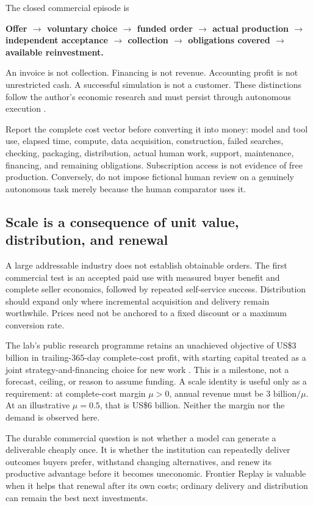 \documentclass[11pt,letterpaper]{article}
\theoremstyle{remark}\newtheorem{remark}{Remark}[section]
\begin{document}
The closed commercial episode is
\begin{center}
\small\textbf{Offer $\rightarrow$ voluntary choice $\rightarrow$ funded order $\rightarrow$ actual production $\rightarrow$ independent acceptance $\rightarrow$ collection $\rightarrow$ obligations covered $\rightarrow$ available reinvestment.}
\end{center}
An invoice is not collection. Financing is not revenue. Accounting profit is not unrestricted cash. A successful simulation is not a customer. These distinctions follow the author's economic research and must persist through autonomous execution \citep{notes30,notes29,omegapaper}.

Report the complete cost vector before converting it into money: model and tool use, elapsed time, compute, data acquisition, construction, failed searches, checking, packaging, distribution, actual human work, support, maintenance, financing, and remaining obligations. Subscription access is not evidence of free production. Conversely, do not impose fictional human review on a genuinely autonomous task merely because the human comparator uses it.

\subsection{Scale is a consequence of unit value, distribution, and renewal}
A large addressable industry does not establish obtainable orders. The first commercial test is an accepted paid use with measured buyer benefit and complete seller economics, followed by repeated self-service success. Distribution should expand only where incremental acquisition and delivery remain worthwhile. Prices need not be anchored to a fixed discount or a maximum conversion rate.

The lab's public research programme retains an unachieved objective of US\$3 billion in trailing-365-day complete-cost profit, with starting capital treated as a joint strategy-and-financing choice for new work \citep{labreadme}. This is a milestone, not a forecast, ceiling, or reason to assume funding. A scale identity is useful only as a requirement: at complete-cost margin $\mu>0$, annual revenue must be $3\text{ billion}/\mu$. At an illustrative $\mu=0.5$, that is US\$6 billion. Neither the margin nor the demand is observed here.

The durable commercial question is not whether a model can generate a deliverable cheaply once. It is whether the institution can repeatedly deliver outcomes buyers prefer, withstand changing alternatives, and renew its productive advantage before it becomes uneconomic. Frontier Replay is valuable when it helps that renewal after its own costs; ordinary delivery and distribution can remain the best next investments.
\end{document}

